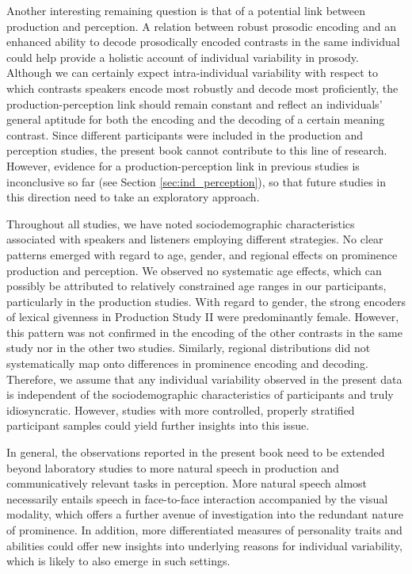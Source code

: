 Another interesting remaining question is that of a potential link between production and perception. A relation between robust prosodic encoding and an enhanced ability to decode prosodically encoded contrasts in the same individual could help provide a holistic account of individual variability in prosody. Although we can certainly expect intra-individual variability with respect to which contrasts speakers encode most robustly and decode most proficiently, the production-perception link should remain constant and reflect an individuals' general aptitude for both the encoding and the decoding of a certain meaning contrast. Since different participants were included in the production and perception studies, the present book cannot contribute to this line of research. However, evidence for a production-perception link in previous studies is inconclusive so far (see Section \ref{sec:ind_perception}), so that future studies in this direction need to take an exploratory approach.

Throughout all studies, we have noted sociodemographic characteristics associated with speakers and listeners employing different strategies. No clear patterns emerged with regard to age, gender, and regional effects on prominence production and perception. We observed no systematic age effects, which can possibly be attributed to relatively constrained age ranges in our participants, particularly in the production studies. With regard to gender, the strong encoders of lexical givenness in Production Study II were predominantly female. However, this pattern was not confirmed in the encoding of the other contrasts in the same study nor in the other two studies. Similarly, regional distributions did not systematically map onto differences in prominence encoding and decoding. Therefore, we assume that any individual variability observed in the present data is independent of the sociodemographic characteristics of participants and truly idiosyncratic. However, studies with more controlled, properly stratified participant samples could yield further insights into this issue. 

In general, the observations reported in the present book need to be extended beyond laboratory studies to more natural speech in production and communicatively relevant tasks in perception. More natural speech almost necessarily entails speech in face-to-face interaction accompanied by the visual modality, which offers a further avenue of investigation into the redundant nature of prominence. In addition, more differentiated measures of personality traits and abilities could offer new insights into underlying reasons for individual variability, which is likely to also emerge in such settings.

